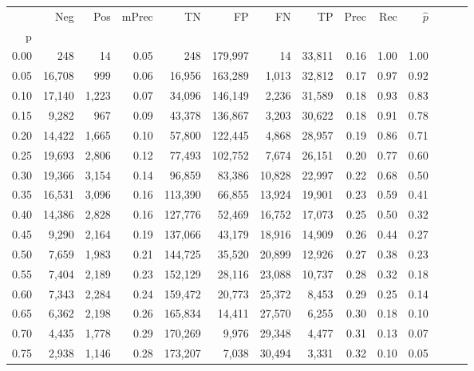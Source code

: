\begin{tabular}{rrrrrrrrrrrrrr}
\toprule
{} &     Neg &    Pos & mPrec &       TN &       FP &      FN &      TP &  Prec &   Rec & $\hat{p}$ \\
p    &         &        &       &          &          &         &         &       &       &           \\
\midrule
0.00 &     248 &     14 &  0.05 &      248 &  179,997 &      14 &  33,811 &  0.16 &  1.00 &      1.00 \\
0.05 &  16,708 &    999 &  0.06 &   16,956 &  163,289 &   1,013 &  32,812 &  0.17 &  0.97 &      0.92 \\
0.10 &  17,140 &  1,223 &  0.07 &   34,096 &  146,149 &   2,236 &  31,589 &  0.18 &  0.93 &      0.83 \\
0.15 &   9,282 &    967 &  0.09 &   43,378 &  136,867 &   3,203 &  30,622 &  0.18 &  0.91 &      0.78 \\
0.20 &  14,422 &  1,665 &  0.10 &   57,800 &  122,445 &   4,868 &  28,957 &  0.19 &  0.86 &      0.71 \\
0.25 &  19,693 &  2,806 &  0.12 &   77,493 &  102,752 &   7,674 &  26,151 &  0.20 &  0.77 &      0.60 \\
0.30 &  19,366 &  3,154 &  0.14 &   96,859 &   83,386 &  10,828 &  22,997 &  0.22 &  0.68 &      0.50 \\
0.35 &  16,531 &  3,096 &  0.16 &  113,390 &   66,855 &  13,924 &  19,901 &  0.23 &  0.59 &      0.41 \\
0.40 &  14,386 &  2,828 &  0.16 &  127,776 &   52,469 &  16,752 &  17,073 &  0.25 &  0.50 &      0.32 \\
0.45 &   9,290 &  2,164 &  0.19 &  137,066 &   43,179 &  18,916 &  14,909 &  0.26 &  0.44 &      0.27 \\
0.50 &   7,659 &  1,983 &  0.21 &  144,725 &   35,520 &  20,899 &  12,926 &  0.27 &  0.38 &      0.23 \\
0.55 &   7,404 &  2,189 &  0.23 &  152,129 &   28,116 &  23,088 &  10,737 &  0.28 &  0.32 &      0.18 \\
0.60 &   7,343 &  2,284 &  0.24 &  159,472 &   20,773 &  25,372 &   8,453 &  0.29 &  0.25 &      0.14 \\
0.65 &   6,362 &  2,198 &  0.26 &  165,834 &   14,411 &  27,570 &   6,255 &  0.30 &  0.18 &      0.10 \\
0.70 &   4,435 &  1,778 &  0.29 &  170,269 &    9,976 &  29,348 &   4,477 &  0.31 &  0.13 &      0.07 \\
0.75 &   2,938 &  1,146 &  0.28 &  173,207 &    7,038 &  30,494 &   3,331 &  0.32 &  0.10 &      0.05 \\

\end{tabular}
